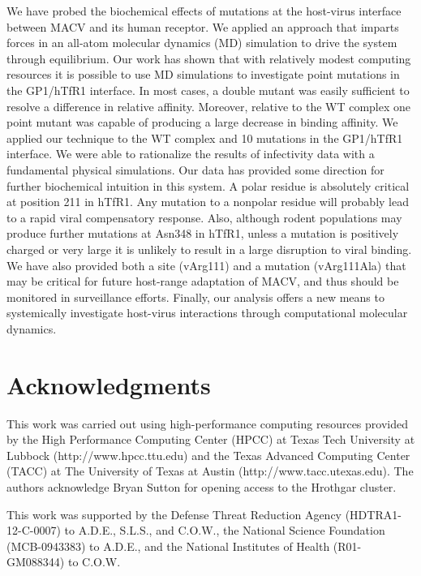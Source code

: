 \documentclass[12pt]{article}
\begin{document}
We have probed the biochemical effects of mutations at the host-virus interface between MACV and its human receptor. We applied an approach that imparts forces in an all-atom molecular dynamics (MD) simulation to drive the system through equilibrium. Our work has shown that with relatively modest computing resources it is possible to use MD simulations to investigate point mutations in the GP1/hTfR1 interface. In most cases, a double mutant was easily sufficient to resolve a difference in relative affinity. Moreover, relative to the WT complex one point mutant was capable of producing a large decrease in binding affinity. We applied our technique to the WT complex and 10 mutations in the GP1/hTfR1 interface. We were able to rationalize the results of infectivity data with a fundamental physical simulations. Our data has provided some direction for further biochemical intuition in this system. A polar residue is absolutely critical at position 211 in hTfR1. Any mutation to a nonpolar residue will probably lead to a rapid viral compensatory response. Also, although rodent populations may produce further mutations at Asn348 in hTfR1, unless a mutation is positively charged or very large it is unlikely to result in a large disruption to viral binding. We have also provided both a site (vArg111) and a mutation (vArg111Ala) that may be critical for future host-range adaptation of MACV, and thus should be monitored in surveillance efforts. Finally, our analysis offers a new means to systemically investigate host-virus interactions through computational molecular dynamics.

\section*{Acknowledgments}
This work was carried out using high-performance computing resources provided by the High Performance Computing Center (HPCC) at Texas Tech University at Lubbock (http://www.hpcc.ttu.edu) and the Texas Advanced Computing Center (TACC) at The University of Texas at Austin (http://www.tacc.utexas.edu). The authors acknowledge Bryan Sutton for opening access to the Hrothgar cluster.

This work was supported by the Defense Threat Reduction Agency (HDTRA1-12-C-0007) to A.D.E., S.L.S., and C.O.W., the National Science Foundation (MCB-0943383) to A.D.E., and the National Institutes of Health (R01-GM088344) to C.O.W.



\end{document}
